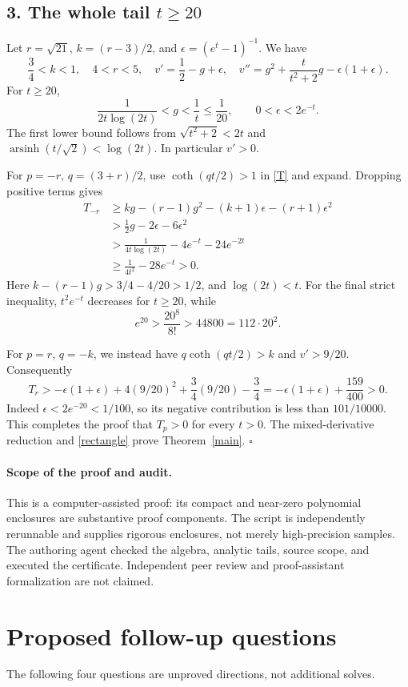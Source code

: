 \documentclass[11pt]{article}
\newcommand{\asinh}{\operatorname{arsinh}}
\begin{document}
\subsection*{3. The whole tail \(t\ge20\)}
Let \(r=\sqrt{21}\), \(k=(r-3)/2\), and
\(\epsilon=(e^t-1)^{-1}\). We have
\[
 \frac{3}{4}<k<1,\quad 4<r<5,\quad
 v'=\frac12-g+\epsilon,\quad
 v''=g^2+\frac{t}{t^2+2}g-\epsilon(1+\epsilon).
\]
For \(t\ge20\),
\[
 \frac1{2t\log(2t)}<g<\frac1t\le\frac1{20},
 \qquad 0<\epsilon<2e^{-t}.
\]
The first lower bound follows from
\(\sqrt{t^2+2}<2t\) and \(\asinh(t/\sqrt2)<\log(2t)\).
In particular \(v'>0\).

For \(p=-r\), \(q=(3+r)/2\), use \(\coth(qt/2)>1\) in \eqref{T}
and expand. Dropping positive terms gives
\begin{align*}
 T_{-r}
 &\ge kg-(r-1)g^2-(k+1)\epsilon-(r+1)\epsilon^2\\
 &>\frac12g-2\epsilon-6\epsilon^2\\
 &>\frac1{4t\log(2t)}-4e^{-t}-24e^{-2t}\\
 &\ge\frac1{4t^2}-28e^{-t}>0.
\end{align*}
Here \(k-(r-1)g>3/4-4/20>1/2\), and
\(\log(2t)<t\). For the final strict inequality,
\(t^2e^{-t}\) decreases for \(t\ge20\), while
\[
 e^{20}>\frac{20^8}{8!}>44800=112\cdot20^2.
\]

For \(p=r\), \(q=-k\), we instead have
\(q\coth(qt/2)>k\) and \(v'>9/20\). Consequently
\[
 T_r>-\epsilon(1+\epsilon)
       +4(9/20)^2+\frac34(9/20)-\frac34
 =-\epsilon(1+\epsilon)+\frac{159}{400}>0.
\]
Indeed \(\epsilon<2e^{-20}<1/100\), so its negative contribution
is less than \(101/10000\).
This completes the proof that \(T_p>0\) for every \(t>0\).
The mixed-derivative reduction and \eqref{rectangle} prove
Theorem~\ref{main}. \(\square\)

\paragraph{Scope of the proof and audit.}
This is a computer-assisted proof: its compact and near-zero
polynomial enclosures are substantive proof components.
The script is independently rerunnable and supplies rigorous
enclosures, not merely high-precision samples.
The authoring agent checked the algebra, analytic tails, source scope,
and executed the certificate. Independent peer review and
proof-assistant formalization are not claimed.

\section*{Proposed follow-up questions}
The following four questions are unproved directions, not additional solves.
\end{document}
